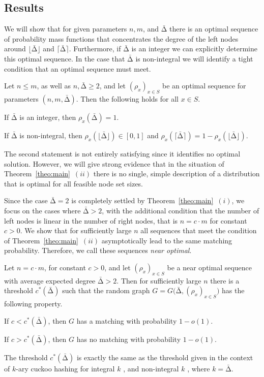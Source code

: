 \let\accentvec\vec \documentclass{llncs}
\newcommand{\keys}{\ensuremath{n}}
\newcommand{\cells}{\ensuremath{m}}
\newcommand{\pmf}{\ensuremath{{\rho}}}
\newcommand{\mean}{{\mathrm{\scriptstyle\Delta}}}
\newcommand{\Amean}{\bar{\mean}}
\newcommand{\floor}[1]{\ensuremath{\lfloor #1\rfloor}}
\newcommand{\ceil}[1]{\ensuremath{\lceil #1\rceil}}
\newcommand{\graph}{\ensuremath{G}}
\begin{document}
\subsection{Results}
We will show that for given parameters $\keys,\cells$, and $\Amean$ there is an optimal sequence
of probability mass functions that concentrates the degree of the left nodes
around $\floor{\Amean}$ and $\ceil{\Amean}$.
Furthermore, if $\Amean$ is an integer we can explicitly determine this optimal sequence. In the
case that $\Amean$ is non-integral we will identify a tight condition that an optimal sequence must meet. 
\begin{theorem}
\label{theo:main}
Let $\keys\leq\cells$, as well as $\keys,\Amean \geq 2$, and
let $({\pmf}_x)_{x\in S}$ be an optimal sequence for parameters $(\keys,\cells,\Amean)$.
Then the following holds for all $x \in S$.
\begin{compactenum}[(i)]
\item If $\Amean$ is an integer, then ${\pmf}_x(\Amean)=1$.
\item If $\Amean$ is non-integral, then $\pmf_x(\floor{\Amean})\in[0,1]$ and ${\pmf}_x(\ceil{\Amean})=1-{\pmf}_x(\floor{\Amean})$.\end{compactenum}
\end{theorem}
The second statement is not entirely satisfying since it identifies no optimal solution.
However, we will give strong evidence that in the situation of Theorem~\ref{theo:main}~$(ii)$ there is no single,
simple description of a distribution that is optimal for all feasible node set sizes.

Since the case $\Amean=2$ is completely settled by Theorem~\ref{theo:main}~$(i)$,
we focus on the cases where $\Amean>2$, with the additional condition that the number of left nodes is linear in the number of right nodes, that is $n=c\cdot m$ for constant $c>0$.
We show that for sufficiently large $n$ all sequences that meet the condition of Theorem~\ref{theo:main}~$(ii)$ 
asymptotically lead to the same matching probability. Therefore, we call these sequences \emph{near optimal}.
\begin{proposition}
\label{prop:thresholds}
Let $n=c\cdot m$, for constant $c>0$, and let $(\pmf_x)_{x\in S}$ be a near optimal sequence with average expected degree $\Amean>2$.
Then for sufficiently large $n$ there is a threshold $c^*(\Amean)$ such that the random graph $\graph=\graph\big(\Amean, (\pmf_x)_{x\in S} \big)$ 
has the following property. 
\begin{compactenum}[(i)]
\item  If  $c<c^*(\Amean)$, then  $\graph$ has a matching with probability $1-o(1)$.
\item  If  $c>c^*(\Amean)$, then   $\graph$ has no matching with probability $1-o(1)$.
\end{compactenum}
\end{proposition}
The threshold $c^*(\Amean)$ is exactly the same as the threshold given in the context of $k$-ary cuckoo hashing for
integral $k$ \cite{FM_maximum_2009,FP_orientability_2010,DGMMPR_tight_2010}, and non-integral $k$ \cite{DGMMPR_tight_2010}, where $k=\Amean$.
\end{document}
